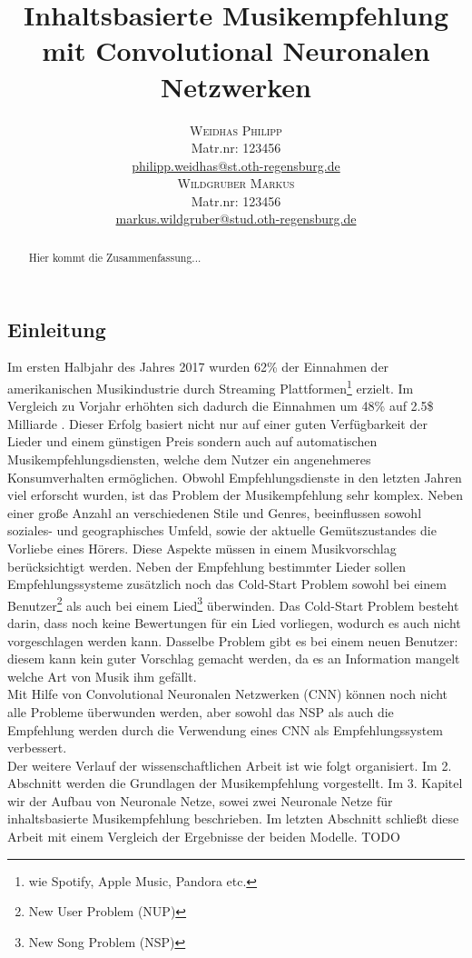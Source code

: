 \documentclass[twosided,a4,10pt]{article}
\title{\vspace{-5mm}%
	\fontsize{20pt}{10pt}\selectfont
	\textbf{Inhaltsbasierte Musikempfehlung mit Convolutional Neuronalen Netzwerken}
}
\author{
	\large\begin{minipage}[t]{0.5\linewidth}
		\begin{center}
			\textsc{Weidhas Philipp}\\[2mm]
			\normalsize	Matr.nr: 123456\\
			\normalsize
			\href{mailto:philipp.weidhas@st.oth-regensburg.de}
			{philipp.weidhas@st.oth-regensburg.de}
		\end{center}
	\end{minipage}
	\begin{minipage}[t]{0.5\linewidth}
		\begin{center}
			\textsc{Wildgruber Markus}\\[2mm]
			\normalsize	Matr.nr: 123456\\
			\normalsize
			\href{mailto:markus.wildgruber@stud.oth-regensburg.de}
			{markus.wildgruber@stud.oth-regensburg.de}
		\end{center}
	\end{minipage}
}
\begin{document}
	
	\maketitle
	\thispagestyle{fancy}
	
	
	
	\begin{multicols}{2}
		
		\begin{abstract}
			\noindent Hier kommt die Zusammenfassung...
		\end{abstract}
		
		
		\section{Einleitung}
		Im ersten Halbjahr des Jahres 2017 wurden 62\% der Einnahmen der amerikanischen Musikindustrie durch Streaming Plattformen\footnote[1]{wie Spotify, Apple Music, Pandora etc.} erzielt. Im Vergleich zu Vorjahr erhöhten sich dadurch die Einnahmen um 48\% auf 2.5\$ Milliarde \cite{friedlander}. Dieser Erfolg basiert nicht nur auf einer guten Verfügbarkeit der Lieder und einem günstigen Preis sondern auch auf automatischen Musikempfehlungsdiensten, welche dem Nutzer ein angenehmeres Konsumverhalten ermöglichen.\newline
		Obwohl Empfehlungsdienste in den letzten Jahren viel erforscht wurden, ist das Problem der Musikempfehlung sehr komplex. Neben einer große Anzahl an verschiedenen Stile und Genres, beeinflussen sowohl soziales- und geographisches Umfeld, sowie der aktuelle Gemütszustandes die Vorliebe eines Hörers. Diese Aspekte müssen in einem Musikvorschlag berücksichtigt werden. \cite{oord}\newline
		Neben der Empfehlung bestimmter Lieder sollen Empfehlungssysteme zusätzlich noch das Cold-Start Problem sowohl bei einem Benutzer\footnote[2]{New User Problem (NUP)} als auch bei einem Lied\footnote[3]{New Song Problem (NSP)} überwinden. Das Cold-Start Problem besteht darin, dass noch keine Bewertungen für ein Lied vorliegen, wodurch es auch nicht vorgeschlagen werden kann. Dasselbe Problem gibt es bei einem neuen Benutzer: diesem kann kein guter Vorschlag gemacht werden, da es an Information mangelt welche Art von Musik ihm gefällt. \cite{celma}\\
		Mit Hilfe von Convolutional Neuronalen Netzwerken (CNN) können noch nicht alle Probleme überwunden werden, aber sowohl das NSP als auch die Empfehlung werden durch die Verwendung eines CNN als Empfehlungssystem verbessert.\newline\\
		Der weitere Verlauf der wissenschaftlichen Arbeit ist wie folgt organisiert. Im 2. Abschnitt werden die Grundlagen der Musikempfehlung vorgestellt. Im 3. Kapitel wir der Aufbau von Neuronale Netze, sowei zwei Neuronale Netze für inhaltsbasierte Musikempfehlung beschrieben. Im letzten Abschnitt schließt diese Arbeit mit einem Vergleich der Ergebnisse der beiden Modelle.
		TODO
	

\end{multicols}
\end{document}
